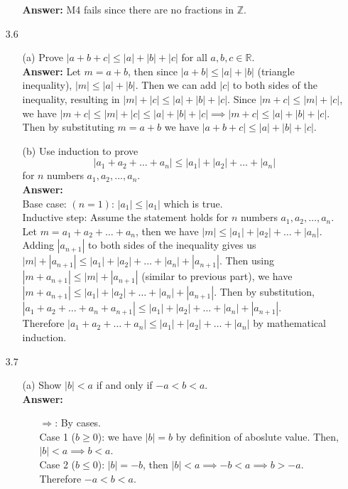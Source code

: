 \documentclass{article}
\begin{document}
\begin{itemize}
\begin{itemize}
                        \textbf{Answer: } M4 fails since there are no fractions in $\mathbb{Z}$.
            \end{itemize}
      \item [3.6]
            \begin{itemize}
                  \item [(a)] Prove $|a+b+c|\leq|a|+|b|+|c|$ for all $a,b,c\in\mathbb{R}$.\\
                        \textbf{Answer: } Let $m=a+b$, then since $|a+b|\leq |a|+|b|$ (triangle inequality), $|m|\leq |a|+|b|$. Then we can add $|c|$ to both sides of the inequality, resulting in $|m|+|c|\leq |a|+|b|+|c|$. Since $|m+c|\leq|m|+|c|$, we have $|m+c|\leq|m|+|c|\leq|a|+|b|+|c|\implies|m+c|\leq|a|+|b|+|c|$. Then by substituting $m=a+b$ we have $|a+b+c|\leq|a|+|b|+|c|$.
                  \item [(b)] Use induction to prove \[|a_1+a_2+\ldots+a_n|\leq|a_1|+|a_2|+\ldots+|a_n|\] for $n$ numbers $a_1,a_2,...,a_n$.\\
                        \textbf{Answer: }\\
                        Base case: $(n=1)$: $|a_1|\leq|a_1|$ which is true.\\
                        Inductive step: Assume the statement holds for $n$ numbers $a_1,a_2,\ldots,a_n$. Let $m=a_1+a_2+\ldots+a_n$, then we have $|m|\leq|a_1|+|a_2|+\ldots+|a_n|$. Adding $|a_{n+1}|$ to both sides of the inequality gives us $|m|+|a_{n+1}|\leq|a_1|+|a_2|+\ldots+|a_n|+|a_{n+1}|$. Then using $|m+a_{n+1}|\leq|m|+|a_{n+1}|$ (similar to previous part), we have $|m+a_{n+1}|\leq|a_1|+|a_2|+\ldots+|a_n|+|a_{n+1}|$. Then by substitution, $|a_1+a_2+\ldots+a_n+a_{n+1}|\leq|a_1|+|a_2|+\ldots+|a_n|+|a_{n+1}|$.\\
                        Therefore $|a_1+a_2+\ldots+a_n|\leq|a_1|+|a_2|+\ldots+|a_n|$ by mathematical induction.
            \end{itemize}
      \item [3.7]
            \begin{itemize}
                  \item [(a)] Show $|b|<a$ if and only if $-a<b<a$.\\
                        \textbf{Answer: } 
                        \begin{itemize}
                              \item [$\Rightarrow$:] By cases. \\Case 1 ($b\geq 0$): we have $|b|=b$ by definition of aboslute value. Then, $|b|<a\implies b<a$. \\Case 2 ($b\leq 0$): $|b|=-b$, then $|b|<a\implies -b<a\implies b>-a$. \\Therefore $-a<b<a$.

\end{itemize}
\end{itemize}
\end{itemize}
\end{document}
